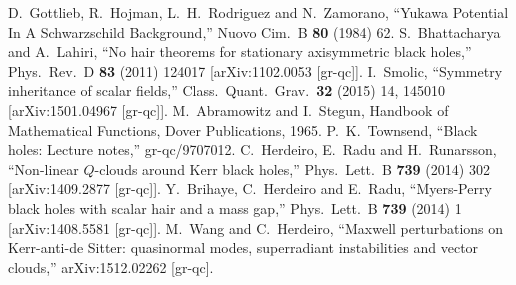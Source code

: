 \documentclass{article}
\numberwithin{equation}{section}
\begin{document}
\begin{small}
\begin{thebibliography}{99}
  D.~Gottlieb, R.~Hojman, L.~H.~Rodriguez and N.~Zamorano,
  ``Yukawa Potential In A Schwarzschild Background,''
  Nuovo Cim.\ B {\bf 80} (1984) 62.
  S.~Bhattacharya and A.~Lahiri,
   ``No hair theorems for stationary axisymmetric black holes,''
  Phys.\ Rev.\ D {\bf 83} (2011) 124017
  [arXiv:1102.0053 [gr-qc]].
  I.~Smolic,
  ``Symmetry inheritance of scalar fields,''
  Class.\ Quant.\ Grav.\  {\bf 32} (2015) 14,  145010
  [arXiv:1501.04967 [gr-qc]].
M.~Abramowitz and I.~Stegun,
Handbook of Mathematical Functions, Dover Publications, 1965.
  P.~K.~Townsend,
  ``Black holes: Lecture notes,''
  gr-qc/9707012.
  C.~Herdeiro, E.~Radu and H.~Runarsson,
  ``Non-linear $Q$-clouds around Kerr black holes,''
  Phys.\ Lett.\ B {\bf 739} (2014) 302
  [arXiv:1409.2877 [gr-qc]].
  Y.~Brihaye, C.~Herdeiro and E.~Radu,
  ``Myers-Perry black holes with scalar hair and a mass gap,''
  Phys.\ Lett.\ B {\bf 739} (2014) 1
  [arXiv:1408.5581 [gr-qc]].
  M.~Wang and C.~Herdeiro,
  ``Maxwell perturbations on Kerr-anti-de Sitter: quasinormal modes, superradiant instabilities and vector clouds,''
  arXiv:1512.02262 [gr-qc].

\end{thebibliography}
\end{small}
\end{document}
